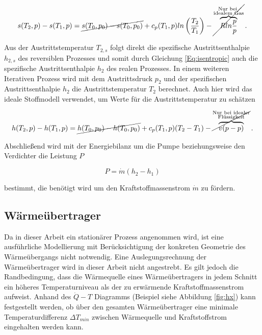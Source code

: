 \begin{equation}\label{Eq:entropy}
	s(T_2,p)-s(T_1, p)=\cancel{s(T_0,p_0) - s(T_0,p_0)} + c_p(T_1,p) ln\left(\frac{T_2}{T_1}\right) - {\cancel{\overbrace{R ln\frac{p}{p}}^{\substack{\text{Nur bei } \\ \text{idealem Gas}}}}}\,.
\end{equation}


Aus der Austrittstemperatur $T_{2,s}$ folgt direkt die spezifische Austrittsenthalpie $h_{2,s}$ des reversiblen Prozesses und somit durch Gleichung \ref{Eq:isentropic} auch die spezifische Austrittsenthalpie $h_2$ des realen Prozesses. In einem weiteren Iterativen Prozess wird mit dem Austrittsdruck $p_2$ und der spezifischen Austrittsenthalpie $h_2$ die Austrittstemperatur $T_2$ berechnet. Auch hier wird das ideale Stoffmodell verwendet, um Werte für die Austrittstemperatur zu schätzen

\begin{equation}\label{Eq:enthalpy}
	h(T_2,p)-h(T_1,p)=\cancel{h(T_0,p_0) - h(T_0,p_0)} + c_p(T_1,p)(T_2 - T_1) - {\cancel{\overbrace{v(p-p)}^{\substack{\text{Nur bei idealer} \\ \text{Flüssigkeit}}}}}\,.
\end{equation}

Abschließend wird mit der Energiebilanz um die Pumpe beziehungsweise den Verdichter die Leistung $P$ 

\begin{equation}\label{Eq:power}
	P=\dot{m}(h_2-h_1)
\end{equation}

bestimmt, die benötigt wird um den Kraftstoffmassenstrom $\dot{m}$ zu fördern.

\subsection{Wärmeübertrager}

Da in dieser Arbeit ein stationärer Prozess angenommen wird, ist eine ausführliche Modellierung mit Berücksichtigung der konkreten Geometrie des Wärmeübergangs nicht notwendig. Eine Auslegungsrechnung der Wärmeübertrager wird in dieser Arbeit nicht angestrebt. Es gilt jedoch die Randbedingung, dass die Wärmequelle eines Wärmeübertragers in jedem Schnitt ein höheres Temperaturniveau als der zu erwärmende Kraftstoffmassenstrom aufweist. Anhand des $\dot{Q}-T$ Diagramms (Beispiel siehe Abbildung \ref{fig:hx}) kann festgestellt werden, ob über den gesamten Wärmeübertrager eine minimale Temperaturdifferenz $\Delta T_{min}$ zwischen Wärmequelle und Kraftstoffstrom eingehalten werden kann.


